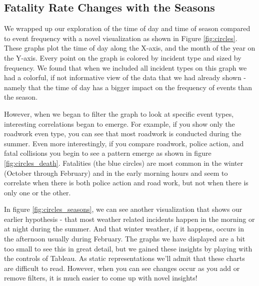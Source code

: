 \documentclass[11pt,letterpaper]{article}
\begin{document}
\subsection*{Fatality Rate Changes with the Seasons}

We wrapped up our exploration of the time of day and time of season compared to event frequency with a novel visualization as shown in Figure \ref{fig:circles}. These graphs plot the time of day along the X-axis, and the month of the year on the Y-axis. Every point on the graph is colored by incident type and sized by frequency. We found that when we included all incident types on this graph we had a colorful, if not informative view of the data that we had already shown - namely that the time of day has a bigger impact on the frequency of events than the season. 

However, when we began to filter the graph to look at specific event types, interesting correlations began to emerge. For example, if you show only the roadwork even type, you can see that most roadwork is conducted during the summer. Even more interestingly, if you compare roadwork, police action, and fatal collisions you begin to see a pattern emerge as shown in figure \ref{fig:circles_death}. Fatalities (the blue circles) are most common in the winter (October through February) and in the early morning hours and seem to correlate when there is both police action and road work, but not when there is only one or the other. 

In figure \ref{fig:circles_seasons}, we can see another visualization that shows our earlier hypothesis - that most weather related incidents happen in the morning or at night during the summer. And that winter weather, if it happens, occurs in the afternoon usually during February. The graphs we have displayed are a bit too small to see this in great detail, but we gained these insights by playing with the controls of Tableau. As static representations we'll admit that these charts are difficult to read. However, when you can see changes occur as you add or remove filters, it is much easier to come up with novel insights! 
\end{document}
